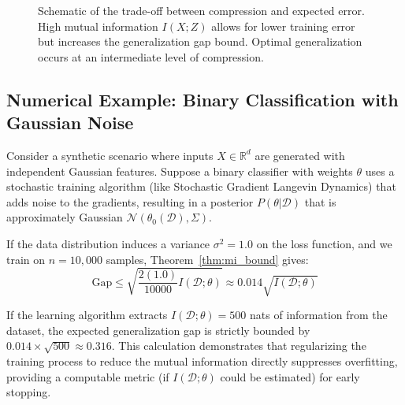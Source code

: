 \begin{figure}[htbp]
\centering
{}
\caption{Schematic of the trade-off between compression and expected error. High mutual information $I(X; Z)$ allows for lower training error but increases the generalization gap bound. Optimal generalization occurs at an intermediate level of compression.}
\label{fig:gen_gap}
\end{figure}

\subsection*{Numerical Example: Binary Classification with Gaussian Noise}
Consider a synthetic scenario where inputs $X \in \mathbb{R}^d$ are generated with independent Gaussian features. Suppose a binary classifier with weights $\theta$ uses a stochastic training algorithm (like Stochastic Gradient Langevin Dynamics) that adds noise to the gradients, resulting in a posterior $P(\theta|\mathcal{D})$ that is approximately Gaussian $\mathcal{N}(\theta_0(\mathcal{D}), \Sigma)$.

If the data distribution induces a variance $\sigma^2 = 1.0$ on the loss function, and we train on $n = 10,000$ samples, Theorem~\ref{thm:mi_bound} gives:
\[ \text{Gap} \leq \sqrt{\frac{2 (1.0)}{10000} I(\mathcal{D}; \theta)} \approx 0.014 \sqrt{I(\mathcal{D}; \theta)} \]

If the learning algorithm extracts $I(\mathcal{D}; \theta) = 500$ nats of information from the dataset, the expected generalization gap is strictly bounded by $0.014 \times \sqrt{500} \approx 0.316$.
This calculation demonstrates that regularizing the training process to reduce the mutual information directly suppresses overfitting, providing a computable metric (if $I(\mathcal{D}; \theta)$ could be estimated) for early stopping.

